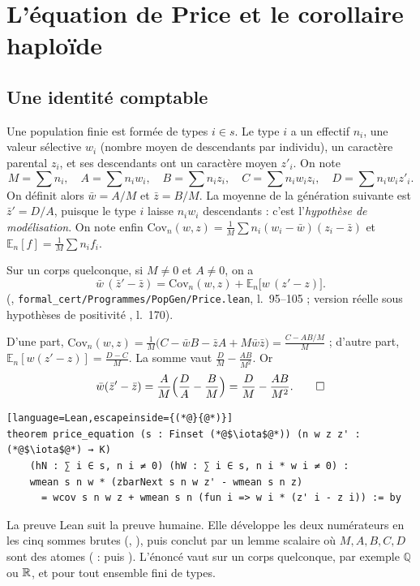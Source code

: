 \section{L'équation de Price et le corollaire haploïde}\label{ch4:sec:price}

\subsection{Une identité comptable}
Une population finie est formée de types $i\in s$. Le type $i$ a un effectif $n_i$, une valeur sélective $w_i$
(nombre moyen de descendants par individu), un caractère parental $z_i$, et ses descendants ont un caractère moyen
$z'_i$. On note
\[
M=\sum n_i,\quad A=\sum n_iw_i,\quad B=\sum n_iz_i,\quad C=\sum n_iw_iz_i,\quad D=\sum n_iw_iz'_i .
\]
On définit alors $\bar w=A/M$ et $\bar z=B/M$. La moyenne de la génération suivante est $\bar z'=D/A$, puisque le
type $i$ laisse $n_iw_i$ descendants : c'est l'\emph{hypothèse de modélisation}. On note enfin
$\mathrm{Cov}_n(w,z)=\frac1M\sum n_i(w_i-\bar w)(z_i-\bar z)$ et $\mathbb E_n[f]=\frac1M\sum n_if_i$.

\begin{theorem}\label{ch4:thm:price}
Sur un corps quelconque, si $M\ne0$ et $A\ne0$, on a
\[
\bar w\,(\bar z'-\bar z)=\mathrm{Cov}_n(w,z)+\mathbb E_n\bigl[w\,(z'-z)\bigr].
\]
\tierA{} (, \texttt{formal\_cert/Programmes/PopGen/Price.lean}, l.~95--105 ; version réelle
sous hypothèses de positivité , l.~170).
\end{theorem}

\begin{humanproof}
D'une part, $\mathrm{Cov}_n(w,z)=\frac1M\bigl(C-\bar wB-\bar zA+M\bar w\bar z\bigr)=\frac{C-AB/M}{M}$ ; d'autre
part, $\mathbb E_n[w(z'-z)]=\frac{D-C}{M}$. La somme vaut $\frac DM-\frac{AB}{M^2}$. Or
\[
\bar w(\bar z'-\bar z)=\frac AM\Bigl(\frac DA-\frac BM\Bigr)=\frac DM-\frac{AB}{M^2}. \qedhere
\]
\end{humanproof}

\begin{leanbox}
\begin{lstlisting}[language=Lean,escapeinside={(*@}{@*)}]
theorem price_equation (s : Finset (*@$\iota$@*)) (n w z z' : (*@$\iota$@*) → K)
    (hN : ∑ i ∈ s, n i ≠ 0) (hW : ∑ i ∈ s, n i * w i ≠ 0) :
    wmean s n w * (zbarNext s n w z' - wmean s n z)
      = wcov s n w z + wmean s n (fun i => w i * (z' i - z i)) := by
\end{lstlisting}
La preuve Lean suit la preuve humaine. Elle développe les deux numérateurs en les cinq sommes brutes
(, ), puis conclut par un lemme scalaire où $M,A,B,C,D$ sont des
atomes ( :  puis ). L'énoncé vaut sur un corps  quelconque,
par exemple $\mathbb Q$ ou $\mathbb{R}$, et pour tout ensemble fini de types.
\end{leanbox}

